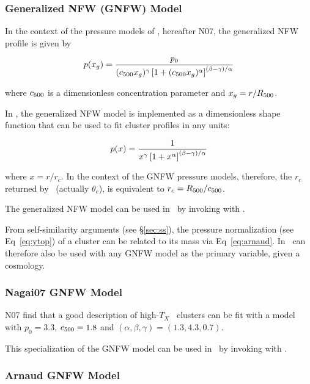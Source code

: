 \subsubsection{Generalized NFW (GNFW) Model}
\label{sec:gnfw}
In the context of the pressure models of \cite{nagai2007}, hereafter N07, the generalized NFW profile is given by

\begin{equation}
p(x_g) = {p_0\over{(\c500 x_g)^\gamma\left[1 + (c_{\rm 500}x_g)^\alpha\right]^{(\beta-\gamma)/\alpha}}}
\label{eq:gnfw}
\end{equation}

where $c_{\rm 500}$ is a dimensionless concentration parameter and $x_g
= r/R_{\rm 500}$.  

In \climax, the generalized NFW model is implemented as a
dimensionless shape function that can be used to fit cluster profiles
in any units:

\begin{equation}
p(x) = {1\over{x^\gamma\left[1 + x^\alpha\right]^{(\beta-\gamma)/\alpha}}}
\end{equation}

where $x = r/r_c$.  In the context of the GNFW pressure models,
therefore, the $r_c$ returned by \climax\ (actually $\theta_c$), is
equivalent to $r_c = \R500/\c500$.

The generalized NFW model can be used in \climax\ by
invoking  with .

From self-similarity arguments (see \S\ref{sec:ss}), the pressure
normalization (see Eq~\ref{eq:ytop}) of a cluster can be related to
its mass via Eq~\ref{eq:arnaud}.  In \climax\,  can
therefore also be used with any GNFW model as the primary variable,
given a cosmology.

\subsubsection{Nagai07 GNFW Model}

N07 find that a good description of high-$T_X$ \chandra\
clusters can be fit with a model with $p_0 = 3.3$, $c_{\rm 500} = 1.8$
and $(\alpha,\beta,\gamma) = (1.3, 4.3, 0.7)$.

This specialization of the GNFW model can be used in \climax\ by
invoking \code{addmodel} with \code{type = nagai07model}.

\subsubsection{Arnaud GNFW Model}

